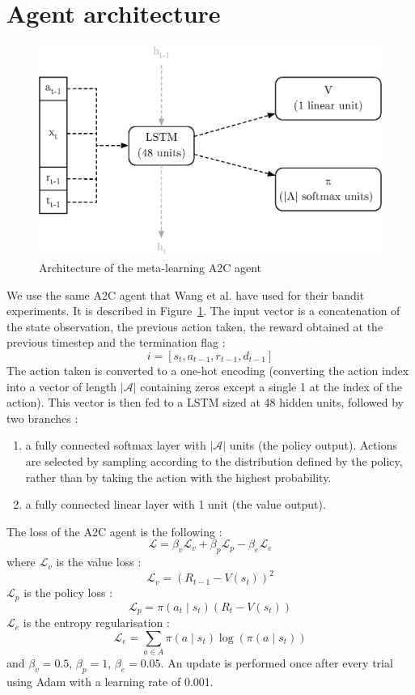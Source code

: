 \section{Agent architecture}
\begin{figure}
	\centering
	\includegraphics[width=0.7\linewidth]{fig/agent_architecture.eps}
	\caption{Architecture of the meta-learning A2C agent}
	\label{fig:agent_architecture}
\end{figure}
We use the same A2C agent that Wang et al. \cite{learningtorl} have used
for their bandit experiments. It is described in Figure~\ref{fig:agent_architecture}.
The input vector is a concatenation of the state observation, the previous
action taken, the reward obtained at the previous timestep and the termination
flag :
$$ i = [s_t, a_{t-1}, r_{t-1}, d_{t-1}] $$
The action taken is converted to a one-hot encoding (converting the action
index into a vector of length $|\mathcal{A}|$ containing zeros except a single
1 at the index of the action). This vector is then fed to a LSTM sized at 48
hidden units, followed by two branches :
\begin{enumerate}
	\item a fully connected softmax layer with $|\mathcal{A}|$ units (the policy
		output). Actions are selected by sampling according to the
		distribution defined by the policy, rather than by taking the
		action with the highest probability.
	\item a fully connected linear layer with 1 unit (the value output).
\end{enumerate}
The loss of the A2C agent is the following : 
$$ \mathcal{L} = \beta_v \mathcal{L}_v + \beta_p \mathcal{L}_p - \beta_e 
 \mathcal{L}_e $$
where $\mathcal{L}_v$ is the value loss : 
$$ \mathcal{L}_v = (R_{t-1} - V(s_t))^2$$
$\mathcal{L}_p$ is the policy loss : 
$$ \mathcal{L}_p = \pi(a_t \mid s_t) (R_t - V(s_t))$$
$\mathcal{L}_e$ is the entropy regularisation : 
$$ \mathcal{L}_e = \sum\limits_{a \in A}\pi(a \mid s_t)\log(\pi(a \mid s_t))$$
and $\beta_v = 0.5$, $\beta_p = 1$, $\beta_e = 0.05$. An update is performed
once after every trial using Adam \cite{adam} with a learning rate of 0.001.\\

